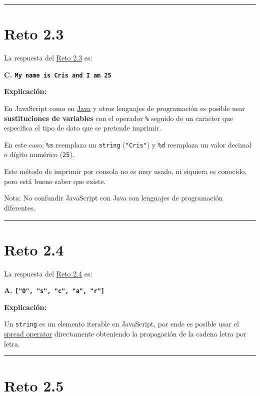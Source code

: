 \documentclass[
  letterpaper,
  DIV=11,
  numbers=noendperiod]{scrreprt}
\begin{document}
\begin{center}\rule{0.5\linewidth}{0.5pt}\end{center}

\section{Reto 2.3}\label{sec-sol-cap2-reto3}

La respuesta del \hyperref[sec-cap2-reto3]{Reto 2.3} es:

\textbf{C. \texttt{My\ name\ is\ Cris\ and\ I\ am\ 25}}

\textbf{Explicación:}

En JavaScript como en \hyperref[glos-java]{Java} y otros lenguajes de
programación es posible usar \textbf{sustituciones de variables} con el
operador \texttt{\%} seguido de un caracter que especifica el tipo de
dato que se pretende imprimir.

En este caso, \texttt{\%s} reemplaza un \texttt{string}
(\texttt{"Cris"}) y \texttt{\%d} reemplaza un valor decimal o dígito
numérico (\texttt{25}).

Este método de imprimir por consola no es muy usado, ni siquiera es
conocido, pero está bueno saber que existe.

Nota: No confundir JavaScript con Java son lenguajes de programación
diferentes.

\begin{center}\rule{0.5\linewidth}{0.5pt}\end{center}

\section{Reto 2.4}\label{sec-sol-cap2-reto4}

La respuesta del \hyperref[sec-cap2-reto4]{Reto 2.4} es:

\textbf{A. \texttt{{[}"O",\ "s",\ "c",\ "a",\ "r"{]}}}

\textbf{Explicación:}

Un \texttt{string} es un elemento iterable en JavaScript, por ende es
posible usar el \hyperref[glos-spread_operator]{spread operator}
directamente obteniendo la propagación de la cadena letra por letra.

\begin{center}\rule{0.5\linewidth}{0.5pt}\end{center}

\section{Reto 2.5}\label{sec-sol-cap2-reto5}
\end{document}
